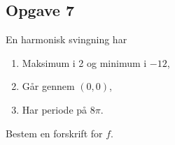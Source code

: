 \subsection*{Opgave 7}
En harmonisk svingning har
\begin{enumerate}[label=$\circ$]
	\item[$\cdot$] Maksimum i 2 og minimum i $-12$,
	\item[$\cdot$] Går gennem $(0,0)$,
	\item[$\cdot$] Har periode på $8\pi$.
\end{enumerate} 
Bestem en forskrift for $f$. 
